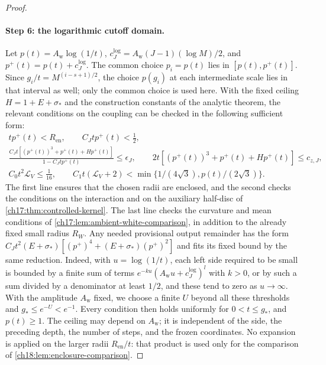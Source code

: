 \begin{proof}
\paragraph{Step 6: the logarithmic cutoff domain.}
Let $p(t)=A_{\mathrm w}\log(1/t)$, $c_J^{\log}=A_{\mathrm w}(J-1)(\log M)/2$, and $p^+(t)=p(t)+c_J^{\log}$. The common choice $p_i=p(t)$ lies in $[p(t),p^+(t)]$. Since $g_i/t=M^{(i-s+1)/2}$, the choice $p(g_i)$ at each intermediate scale lies in that interval as well; only the common choice is used here. With the fixed ceiling $H=1+E+\sigma_*$ and the construction constants of the analytic theorem, the relevant conditions on the coupling can be checked in the following sufficient form:
\begin{equation}\label{ch18:eq:logarithmic-product-gates}
 \begin{gathered}
 t p^+(t)<R_{\mathrm{en}},\qquad C_Jt p^+(t)<\tfrac12,\\
 \frac{C_Jt[(p^+(t))^3+p^+(t)+Hp^+(t)]}
                   {1-C_Jt p^+(t)}\le\epsilon_J,\qquad
 2t[(p^+(t))^3+p^+(t)+Hp^+(t)]\le c_{z,J},\\
 C_0t^2\mathcal L_V\le\tfrac1{16},\qquad
 C_1t(\mathcal L_V+2)
       <\min\{1/(4\sqrt3),p(t)/(2\sqrt3)\}.
 \end{gathered}
\end{equation}
The first line ensures that the chosen radii are enclosed, and the second checks the conditions on the interaction and on the auxiliary half-disc of \cref{ch17:thm:controlled-kernel}. The last line checks the curvature and mean conditions of \cref{ch17:lem:ambient-white-comparison}, in addition to the already fixed small radius $R_W$. Any needed provisional output remainder has the form $C_Jt^2(E+\sigma_*)[(p^+)^4+(E+\sigma_*)(p^+)^2]$ and fits its fixed bound by the same reduction. Indeed, with $u=\log(1/t)$, each left side required to be small is bounded by a finite sum of terms $e^{-ku}(A_{\mathrm w}u+c_J^{\log})^l$ with $k>0$, or by such a sum divided by a denominator at least $1/2$, and these tend to zero as $u\to\infty$. With the amplitude $A_{\mathrm w}$ fixed, we choose a finite $U$ beyond all these thresholds and $g_*\le e^{-U}<e^{-1}$. Every condition then holds uniformly for $0<t\le g_*$, and $p(t)\ge1$. The ceiling may depend on $A_{\mathrm w}$; it is independent of the side, the preceding depth, the number of steps, and the frozen coordinates. No expansion is applied on the larger radii $R_{\mathrm{en}}/t$: that product is used only for the comparison of \cref{ch18:lem:enclosure-comparison}.
\end{proof}

